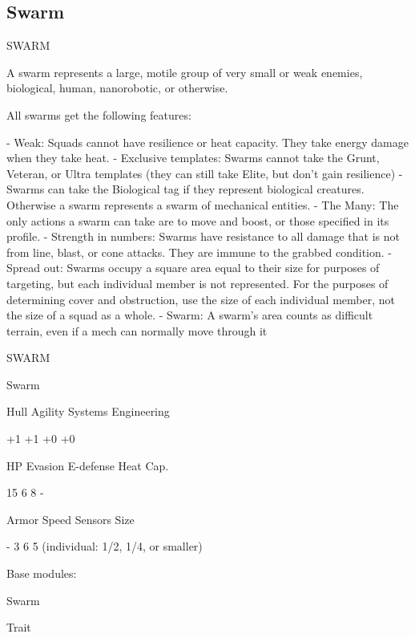 \subsection{Swarm}
                                                   SWARM

A swarm represents a large, motile group of very small or weak enemies, biological, human,
nanorobotic, or otherwise.

All swarms get the following features:

    -    Weak: Squads cannot have resilience or heat capacity. They take energy damage when
         they take heat.
    -    Exclusive templates: Swarms cannot take the Grunt, Veteran, or Ultra templates (they
         can still take Elite, but don't gain resilience)
    -    Swarms can take the Biological tag if they represent biological creatures. Otherwise a
         swarm represents a swarm of mechanical entities.
    -    The Many: The only actions a swarm can take are to move and boost, or those specified
         in its profile.
    -    Strength in numbers: Swarms have resistance to all damage that is not from line, blast,
         or cone attacks. They are immune to the grabbed condition.
    -    Spread out: Swarms occupy a square area equal to their size for purposes of targeting,
         but each individual member is not represented. For the purposes of determining cover
         and obstruction, use the size of each individual member, not the size of a squad as a
         whole.
    -    Swarm: A swarm's area counts as difficult terrain, even if a mech can normally move
         through it

       SWARM

       Swarm

       Hull       Agility      Systems       Engineering

       +1         +1           +0            +0

       HP         Evasion      E-defense     Heat Cap.

       15         6            8             -

       Armor      Speed        Sensors       Size

       -          3            6             5 (individual:
                                             1/2, 1/4, or
                                             smaller)

Base modules:

Swarm

Trait

